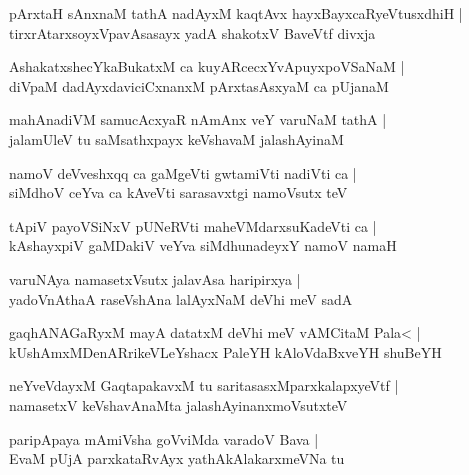 \documentclass[twoside,12pt,openright]{book}
\newcounter{shloka}[chapter]
\begin{document}
\begin{shloka}%
pArxtaH sAnxnaM tathA nadAyxM kaqtAvx hayxBayxcaRyeVtusxdhiH |\\
tirxrAtarxsoyxVpavAsasayx yadA shakotxV BaveVtf divxja
\end{shloka}

\begin{shloka}%
AshakatxshecYkaBukatxM ca kuyARcecxYvApuyxpoVSaNaM |\\
diVpaM dadAyxdaviciCxnanxM pArxtasAsxyaM ca pUjanaM 
\end{shloka}

\begin{shloka}%
mahAnadiVM samucAcxyaR nAmAnx veY varuNaM tathA |\\
jalamUleV tu saMsathxpayx keVshavaM jalashAyinaM 
\end{shloka}

\begin{shloka}%
namoV deVveshxqq ca gaMgeVti gwtamiVti nadiVti ca |\\
siMdhoV ceYva ca kAveVti sarasavxtgi namoVsutx teV 
\end{shloka}

\begin{shloka}%
tApiV payoVSiNxV pUNeRVti maheVMdarxsuKadeVti ca |\\
kAshayxpiV gaMDakiV veYva siMdhunadeyxY namoV namaH
\end{shloka}

\begin{shloka}%
varuNAya namasetxVsutx jalavAsa haripirxya |\\
yadoVnAthaA raseVshAna lalAyxNaM deVhi meV sadA
\end{shloka}

\begin{shloka}%
gaqhANAGaRyxM mayA datatxM deVhi meV vAMCitaM Pala< |\\
kUshAmxMDenARrikeVLeYshacx PaleYH kAloVdaBxveYH shuBeYH
\end{shloka}

\begin{shloka}%
neYveVdayxM GaqtapakavxM tu saritasasxMparxkalapxyeVtf |\\
namasetxV keVshavAnaMta jalashAyinanxmoVsutxteV 
\end{shloka}

\begin{shloka}%
paripApaya mAmiVsha goVviMda varadoV Bava |\\
EvaM pUjA parxkataRvAyx yathAkAlakarxmeVNa tu 
\end{shloka}
\end{document}
